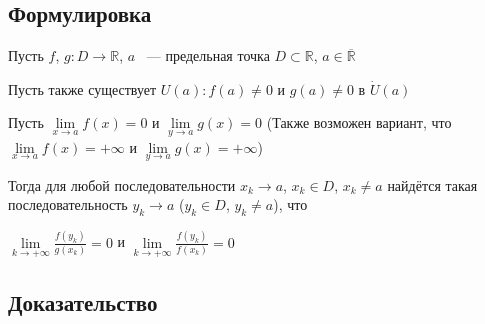 \documentclass{article}
\begin{document}
		\subsection{Формулировка}
		
			Пусть $f$, $g : D \rightarrow \mathbb{R}$, $a$ ~--- предельная точка $D \subset \mathbb{R}$, $a \in \overline{\mathbb{R}}$
		
			Пусть также существует $U(a) : f(a) \neq 0$ и $g(a) \neq 0$ в $\dot{U}(a)$
		
			Пусть $\lim\limits_{x \rightarrow a} f(x) = 0$ и $\lim\limits_{y \rightarrow a} g(x) = 0$ (Также возможен вариант, что $\lim\limits_{x \rightarrow a} f(x) = + \infty$ и $\lim\limits_{y \rightarrow a} g(x) = +\infty$)
			
			Тогда для любой последовательности $x_k \rightarrow a$, $x_k \in D$, $x_k \neq a$ найдётся такая последовательность $y_k \rightarrow a$ ($y_k \in D$, $y_k \neq a$), что 
			
			$\lim\limits_{k \rightarrow +\infty} \frac{f(y_k)}{g(x_k)} = 0$ и $\lim\limits_{k \rightarrow +\infty} \frac{f(y_k)}{f(x_k)} = 0$
			
		\subsection{Доказательство}
		
\end{document}
